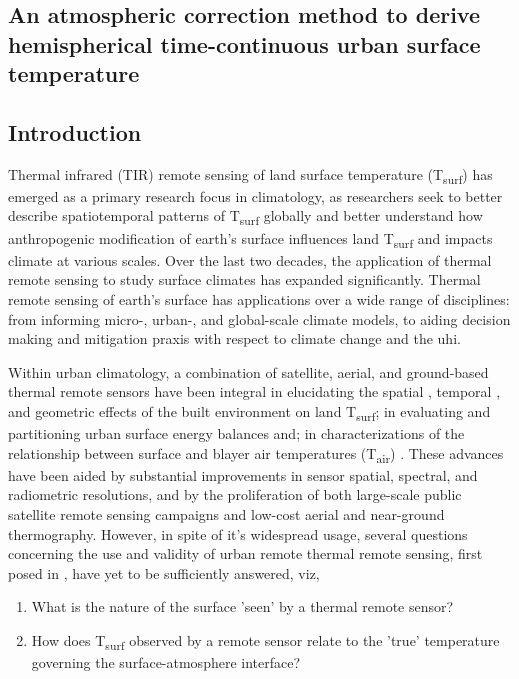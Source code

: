 \begin{bibunit}

\rhead{\thepage}

\chapter{An atmospheric correction method to derive hemispherical time-continuous urban surface temperature}\label{paper1}

\section{Introduction}
Thermal infrared (TIR) remote sensing of land surface temperature (T\textsubscript{surf}) has emerged as a primary research focus in climatology, as researchers seek to better describe spatiotemporal patterns of T\textsubscript{surf} globally and better understand how anthropogenic modification of earth's surface influences land T\textsubscript{surf} and impacts climate at various scales. Over the last two decades, the application of thermal remote sensing to study surface climates has expanded significantly. Thermal remote sensing of earth's surface has applications over a wide range of disciplines: from informing micro-, urban-, and global-scale climate models, to aiding decision making and mitigation praxis with respect to climate change and the \gls{uhi}. 

Within urban climatology, a combination of satellite, aerial, and ground-based thermal remote sensors have been integral in elucidating the spatial \citep{Roth1989}, temporal \citep{Peng2012}, and geometric \citep{Voogt1997} effects of the built environment on land T\textsubscript{surf}; in evaluating and partitioning urban surface energy balances \citep{BastiaanssenW.G.M.1998, Yamaguchi2005} and; in characterizations of the relationship between surface and \gls{blayer} air temperatures (T\textsubscript{air}) \citep{Stoll1992}. These advances have been aided by substantial improvements in sensor spatial, spectral, and radiometric resolutions, and by the proliferation of both large-scale public satellite remote sensing campaigns and low-cost aerial and near-ground thermography. However, in spite of it's widespread usage, several questions concerning the use and validity of urban remote thermal remote sensing, first posed in \citet{Roth1989}, have yet to be sufficiently answered, viz,

\begin{enumerate}
	\item What is the nature of the surface 'seen' by a thermal remote sensor?
	\item How does T\textsubscript{surf} observed by a remote sensor relate to the 'true' temperature governing the surface-atmosphere interface?
\end{enumerate}


\end{bibunit}
